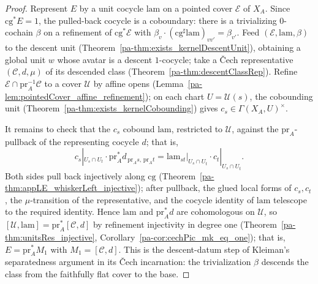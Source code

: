 \begin{proof}
  \leanok
  Represent \(E\) by a unit cocycle \(\mathrm{lam}\) on a pointed cover \(\mathcal E\) of
  \(X_A\).  Since \(\mathrm{cg}^{*} E = 1\), the pulled-back cocycle is a coboundary: there is a
  trivializing \(0\)-cochain \(\beta\) on a refinement of \(\mathrm{cg}^{*}\mathcal E\) with
  \(\beta_v \cdot (\mathrm{cg}^{\sharp}\mathrm{lam})_{vv'} = \beta_{v'}\).  Feed \((\mathcal E,
  \mathrm{lam}, \beta)\) to the descent unit (Theorem~\ref{pa-thm:exists_kernelDescentUnit}),
  obtaining a global unit \(w\) whose avatar is a descent \(1\)-cocycle; take a \v Cech
  representative \((\mathcal C, d, \mu)\) of its descended class
  (Theorem~\ref{pa-thm:descentClassRep}).  Refine \(\mathcal E \cap \mathrm{pr}_A^{-1}\mathcal C\)
  to a cover \(\mathcal U\) by affine opens (Lemma~\ref{pa-lem:pointedCover_affine_refinement}); on
  each chart \(U = \mathcal U(s)\), the cobounding unit
  (Theorem~\ref{pa-thm:exists_kernelCobounding}) gives \(c_s \in \Gamma(X_A, U)^{\times}\).

  It remains to check that the \(c_s\) cobound \(\mathrm{lam}\), restricted to \(\mathcal U\),
  against the \(\mathrm{pr}_A\)-pullback of the representing cocycle \(d\); that is,
  \[
    c_s|_{U_s \cap U_t} \cdot \mathrm{pr}_A^{*} d_{\,\mathrm{pr}_A s,\,\mathrm{pr}_A t}
      = \mathrm{lam}_{s t}\big|_{U_s \cap U_t} \cdot c_t|_{U_s \cap U_t}.
  \]
  Both sides pull back injectively along \(\mathrm{cg}\)
  (Theorem~\ref{pa-thm:appLE_whiskerLeft_injective}); after pullback, the glued local forms of
  \(c_s, c_t\), the \(\mu\)-transition of the representative, and the cocycle identity of
  \(\mathrm{lam}\) telescope to the required identity.  Hence \(\mathrm{lam}\) and
  \(\mathrm{pr}_A^{*} d\) are cohomologous on \(\mathcal U\), so \([\mathcal U, \mathrm{lam}] =
  \mathrm{pr}_A^{*}[\mathcal C, d]\) by refinement injectivity in degree one
  (Theorem~\ref{pa-thm:unitsRes_injective}, Corollary~\ref{pa-cor:cechPic_mk_eq_one}); that is, \(E =
  \mathrm{pr}_A^{*} M_1\) with \(M_1 = [\mathcal C, d]\).  This is the descent-datum step of
  Kleiman's separatedness argument in its \v Cech incarnation: the trivialization \(\beta\)
  descends the class from the faithfully flat cover to the base.
\end{proof}


